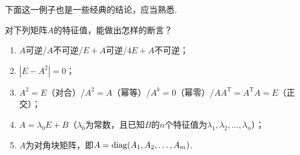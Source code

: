 下面这一例子也是一些经典的结论，应当熟悉.
\begin{example}\label{ex:18:特征值的性质}
    对下列矩阵$A$的特征值，能做出怎样的断言？
    \begin{enumerate}
        \item $A$可逆/$A$不可逆/$E+A$可逆/$4E+A$不可逆；

        \item $|E-A^2|=0$；

        \item $A^2=E$（对合）/$A^2=A$（幂等）/$A^k=0$（幂零）/$AA^\mathrm{T}=A^\mathrm{T}A=E$（正交）；

        \item $A=\lambda_0E+B$（$\lambda_0$为常数，且已知$B$的$n$个特征值为$\lambda_1,\lambda_2,\ldots,\lambda_n$）；

        \item $A$为对角块矩阵，即$A=\operatorname{diag}(A_1,A_2,\ldots,A_m)$.
    \end{enumerate}
\end{example}

